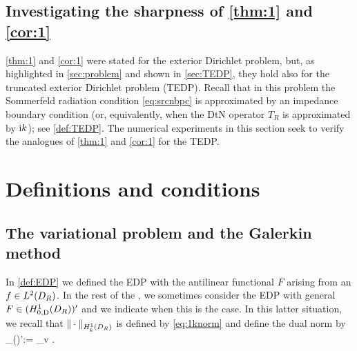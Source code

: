 \subsection{Investigating the sharpness of \cref{thm:1} and \cref{cor:1}}

\cref{thm:1} and \cref{cor:1} were stated for the exterior Dirichlet problem, but, as highlighted in \cref{sec:problem} and shown in \cref{sec:TEDP}, they hold also for the truncated exterior Dirichlet problem (TEDP). Recall that in this problem the Sommerfeld radiation condition \cref{eq:srcnbpc} is approximated by an impedance boundary condition (or, equivalently, when the DtN operator $T_R$ is approximated by $\mathrm{i} k$); see \cref{def:TEDP}. The numerical experiments in this section seek to verify the analogues of \cref{thm:1} and \cref{cor:1} for the TEDP.



\section{Definitions and conditions}\label{sec:3}

\subsection{The variational problem and the Galerkin method}\label{sec:vpGm}

In \cref{def:EDP} we defined the EDP with the antilinear functional $F$ arising from an $f\in \LtDR$. In the rest of the , 
we sometimes consider the EDP with general $F\in (\HozDDR)'$ and we indicate when this is the case.
In this latter situation, we recall that $\|\cdot\|_{\HokDR}$ is defined by \cref{eq:1knorm} and define the dual norm by
\beq\label{eq:dualnorm}
_{(\HokDR)'}:= \sup_{v\in \HozDDR} .
\eeq
\ere




